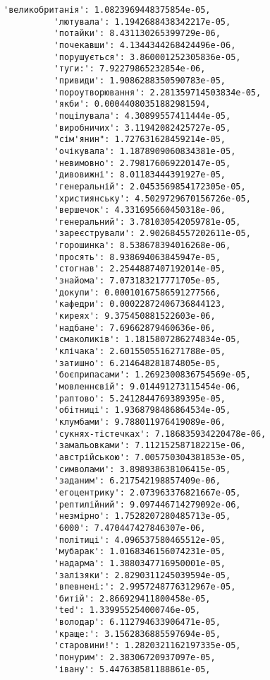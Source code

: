 \documentclass[11pt]{article}
\begin{document}
\begin{Verbatim}[commandchars=\\\{\}]
          'великобританія': 1.0823969448375854e-05,
          'лютувала': 1.1942688438342217e-05,
          'потайки': 8.431130265399729e-06,
          'почекавши': 4.1344344268424496e-06,
          'порушується': 3.860001252305836e-05,
          'туги:': 7.92279865232854e-06,
          'привиди': 1.9086288350590783e-05,
          'пороутворювання': 2.281359714503834e-05,
          'якби': 0.00044080351882981594,
          'поцілувала': 4.30899557411444e-05,
          'виробничих': 3.11942082425727e-05,
          "сім'янин": 1.727631628459214e-05,
          'очікувала': 1.1878909060834381e-05,
          'невимовно': 2.798176069220147e-05,
          'дивовижні': 8.01183444391927e-05,
          'генеральній': 2.0453569854172305e-05,
          'християнську': 4.5029729670156726e-05,
          'вершечок': 4.331695660450318e-06,
          'генеральний': 3.781030542059781e-05,
          'зареєстрували': 2.902684557202611e-05,
          'горошинка': 8.538678394016268e-06,
          'просять': 8.938694063845947e-05,
          'стогнав': 2.2544887407192014e-05,
          'знайома': 7.073183217771705e-05,
          'докупи': 0.00010167586591277566,
          'кафедри': 0.00022872406736844123,
          'киреях': 9.375450881522603e-06,
          'надбане': 7.69662879460636e-06,
          'смаколиків': 1.1815807286274834e-05,
          'клічака': 2.6015505516271788e-05,
          'затишно': 6.214648281874805e-05,
          'боєприпасами': 1.2692300836754569e-05,
          'мовленнєвій': 9.014491273115454e-06,
          'раптово': 5.2412844769389395e-05,
          'обітниці': 1.9368798486864534e-05,
          'клумбами': 9.788011976419089e-06,
          'сукнях-тістечках': 7.186835934220478e-06,
          'замальовками': 7.112152587182215e-06,
          'австрійською': 7.005750304381853e-05,
          'символами': 3.898938638106415e-05,
          'заданим': 6.217542198857409e-06,
          'егоцентрику': 2.073963376821667e-05,
          'рептилійний': 9.097446714279092e-06,
          'незмірно': 1.7528207280485713e-05,
          '6000': 7.470447427846307e-06,
          'політиці': 4.096537580465512e-05,
          'мубарак': 1.0168346156074231e-05,
          'надарма': 1.3880347716950001e-05,
          'залізяки': 2.8290311245039594e-05,
          'впевнені:': 2.9957248776312967e-05,
          'битій': 2.866929411800458e-05,
          'ted': 1.339955254000746e-05,
          'володар': 6.112794633906471e-05,
          'краще:': 3.1562836885597694e-05,
          'старовини!': 1.2820321162197335e-05,
          'понурим': 2.38306720937097e-05,
          'івану': 5.447638581188861e-05,

\end{Verbatim}
\end{document}
